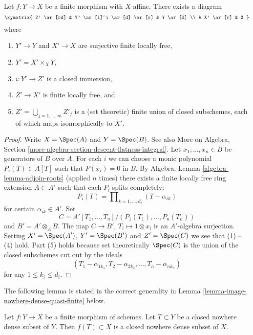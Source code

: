 \begin{lemma}
\label{lemma-massage-finite}
Let $f : Y \to X$ be a finite morphism with $X$ affine.
There exists a diagram
$$
\xymatrix{
Z' \ar[rd] &
Y' \ar[l]^i \ar[d] \ar[r] &
Y \ar[d] \\
 & X' \ar[r] & X
}
$$
where
\begin{enumerate}
\item $Y' \to Y$ and $X' \to X$ are surjective finite locally free,
\item $Y' = X' \times_X Y$,
\item $i : Y' \to Z'$ is a closed immersion,
\item $Z' \to X'$ is finite locally free, and
\item $Z' = \bigcup_{j = 1, \ldots, m} Z'_j$ is a (set theoretic)
finite union of closed subschemes, each of which maps isomorphically
to $X'$.
\end{enumerate}
\end{lemma}

\begin{proof}
Write $X = \Spec(A)$ and $Y = \Spec(B)$. See also
More on Algebra, Section \ref{more-algebra-section-descent-flatness-integral}.
Let $x_1, \ldots, x_n \in B$ be generators of $B$ over $A$.
For each $i$ we can choose a monic polynomial $P_i(T) \in A[T]$
such that $P(x_i) = 0$ in $B$. By
Algebra, Lemma \ref{algebra-lemma-adjoin-roots}
(applied $n$ times) there exists a finite locally free ring
extension $A \subset A'$ such that each $P_i$ splits completely:
$$
P_i(T) = \prod\nolimits_{k = 1, \ldots, d_i} (T - \alpha_{ik})
$$
for certain $\alpha_{ik} \in A'$. Set
$$
C = A'[T_1, \ldots, T_n]/(P_1(T_1), \ldots, P_n(T_n))
$$
and $B' = A' \otimes_A B$. The map $C \to B'$, $T_i \mapsto 1 \otimes x_i$
is an $A'$-algebra surjection. Setting $X' = \Spec(A')$,
$Y' = \Spec(B')$ and $Z' = \Spec(C)$ we see that
(1) -- (4) hold. Part (5) holds because set theoretically
$\Spec(C)$ is the union of the closed subschemes
cut out by the ideals
$$
(T_1 - \alpha_{1k_1}, T_2 - \alpha_{2k_2}, \ldots, T_n - \alpha_{nk_n})
$$
for any $1 \leq k_i \leq d_i$.
\end{proof}

\noindent
The following lemma is stated in the correct generality
in Lemma \ref{lemma-image-nowhere-dense-quasi-finite} below.

\begin{lemma}
\label{lemma-image-nowhere-dense-finite}
Let $f : Y \to X$ be a finite morphism of schemes.
Let $T \subset Y$ be a closed nowhere dense subset of $Y$.
Then $f(T) \subset X$ is a closed nowhere dense subset of $X$.
\end{lemma}

